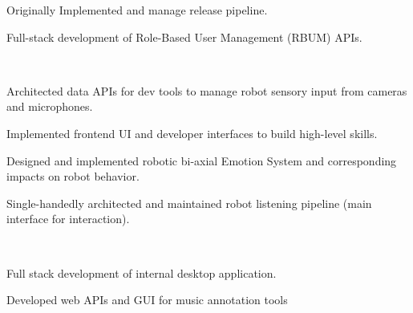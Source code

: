 \documentclass[]{csaund_resume-openfont}
\begin{document}
\begin{minipage}[t]{0.66\textwidth}
\begin{tightemize}
\item Originally Implemented and manage release pipeline.
\item Full-stack development of Role-Based User Management (RBUM) APIs.
\end{tightemize}
\sectionsep

 \\
\begin{tightemize}
\item Architected data APIs for dev tools to manage robot sensory input from cameras and microphones.
\item Implemented frontend UI and developer interfaces to build high-level skills.
\end{tightemize}
\begin{tightemize}
\item Designed and implemented robotic bi-axial Emotion System and corresponding impacts on robot behavior.
\item Single-handedly architected and maintained robot listening pipeline (main interface for interaction).
\end{tightemize}
\sectionsep

 \\
\begin{tightemize}
\item Full stack development of internal desktop application.
\item Developed web APIs and GUI for music annotation tools
\end{tightemize}
\sectionsep

\end{minipage}

\pagebreak

\end{document}
